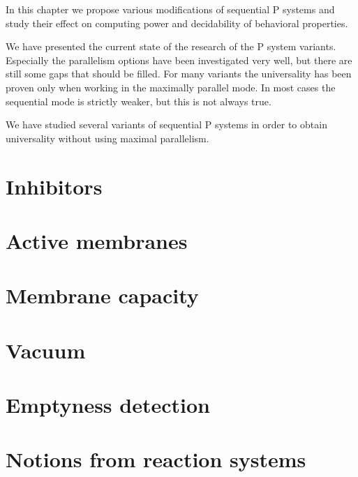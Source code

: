 In this chapter we propose various modifications of sequential P systems and study their effect on computing power and decidability of behavioral properties.

We have presented the current state of the research of the P system variants. Especially the parallelism options have been investigated very well, but there are still some gaps that should be filled. For many variants the universality has been proven only when working in the maximally parallel mode. In most cases the sequential mode is strictly weaker, but this is not always true.

We have studied several variants of sequential P systems in order to obtain universality without using maximal parallelism.

\section{Inhibitors} %
\label{sec:inhibitors}


\section{Active membranes} %
\label{sec:active_membranes}


\section{Membrane capacity} %
\label{sec:membrane_capacity}


\section{Vacuum} %
\label{sec:vacuum}


\section{Emptyness detection} %
\label{sec:emptyness_detection}


\section{Notions from reaction systems} %
\label{sec:notions_from_reaction_systems}

